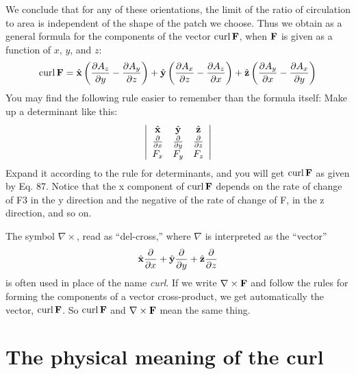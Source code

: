 We conclude that for any of these orientations, the limit of the
ratio of circulation to area is independent of the shape of the patch
we choose. Thus we obtain as a general formula for the components
of the vector $\operatorname{curl}\mathbf{F}$, when $\mathbf{F}$ is given as a function of $x$, $y$, and $z$:
\begin{equation}
\operatorname{curl}\mathbf{F} = 
    \hat{\mathbf{x}}\left(\frac{\partial A_z}{\partial y}-\frac{\partial A_y}{\partial z}\right)
   +\hat{\mathbf{y}}\left(\frac{\partial A_x}{\partial z}-\frac{\partial A_z}{\partial x}\right)
   +\hat{\mathbf{z}}\left(\frac{\partial A_y}{\partial x}-\frac{\partial A_x}{\partial y}\right)
\end{equation}
You may find the following rule easier to remember than the formula
itself: Make up a determinant like this:
\begin{equation}
  \left|
    \begin{array}{ccc}
      \hat{\mathbf{x}} & \hat{\mathbf{y}} & \hat{\mathbf{z}} \\
      \frac{\partial}{\partial x} & \frac{\partial}{\partial y} & \frac{\partial}{\partial z} \\
      F_x & F_y & F_z
    \end{array}
  \right|
\end{equation}
Expand it according to the rule for determinants, and you will get
$\operatorname{curl}\mathbf{F}$ as given by Eq. 87. Notice that the x component of $\operatorname{curl}\mathbf{F}$
depends on the rate of change of F3 in the y direction and the negative
of the rate of change of F, in the z direction, and so on.

The symbol $\nabla \times$, read as ``del-cross,'' where $\nabla$ is interpreted as the
``vector''
\begin{equation}
  \hat{\mathbf{x}}\frac{\partial}{\partial x}
  +\hat{\mathbf{y}}\frac{\partial}{\partial y}
  +\hat{\mathbf{z}}\frac{\partial}{\partial z}
\end{equation}
is often used in place of the name \emph{curl}. If we write $\nabla\times\mathbf{F}$ and follow
the rules for forming the components of a vector cross-product, we
get automatically the vector, $\operatorname{curl}\mathbf{F}$. So $\operatorname{curl}\mathbf{F}$ and $\nabla\times\mathbf{F}$ mean the
same thing.


\section{The physical meaning of the curl}

